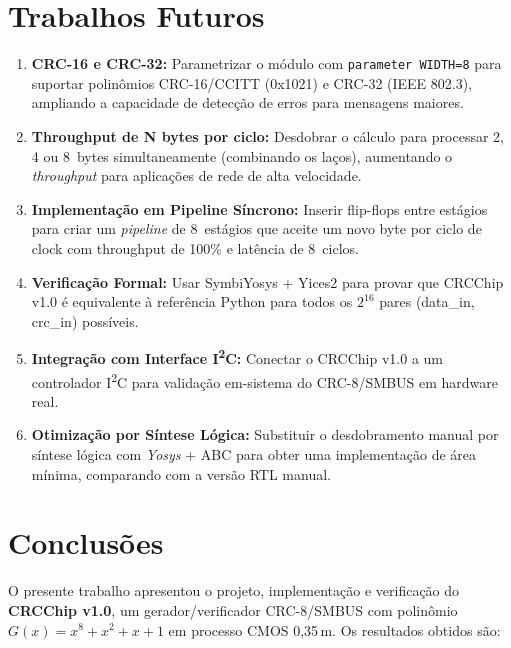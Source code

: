 \documentclass[12pt,a4paper]{article}
\begin{document}
\section{Trabalhos Futuros}

\begin{enumerate}[leftmargin=2em,label=\textbf{TF\arabic*.}]
  \item \textbf{CRC-16 e CRC-32:} Parametrizar o módulo com \texttt{parameter WIDTH=8} para suportar polinômios CRC-16/CCITT (0x1021) e CRC-32 (IEEE 802.3), ampliando a capacidade de detecção de erros para mensagens maiores.

  \item \textbf{Throughput de N bytes por ciclo:} Desdobrar o cálculo para processar 2, 4 ou 8~bytes simultaneamente (combinando os laços), aumentando o \textit{throughput} para aplicações de rede de alta velocidade.

  \item \textbf{Implementação em Pipeline Síncrono:} Inserir flip-flops entre estágios para criar um \textit{pipeline} de 8~estágios que aceite um novo byte por ciclo de clock com throughput de 100\% e latência de 8~ciclos.

  \item \textbf{Verificação Formal:} Usar SymbiYosys + Yices2 para provar que CRCChip v1.0 é equivalente à referência Python para todos os $2^{16}$ pares (data\_in, crc\_in) possíveis.

  \item \textbf{Integração com Interface I\textsuperscript{2}C:} Conectar o CRCChip v1.0 a um controlador I\textsuperscript{2}C para validação em-sistema do CRC-8/SMBUS em hardware real.

  \item \textbf{Otimização por Síntese Lógica:} Substituir o desdobramento manual por síntese lógica com \textit{Yosys} + ABC para obter uma implementação de área mínima, comparando com a versão RTL manual.
\end{enumerate}

\section{Conclusões}

O presente trabalho apresentou o projeto, implementação e verificação do \textbf{CRCChip v1.0}, um gerador/verificador CRC-8/SMBUS com polinômio $G(x) = x^8 + x^2 + x + 1$ em processo CMOS 0,35\,\textmu m. Os resultados obtidos são:
\end{document}
